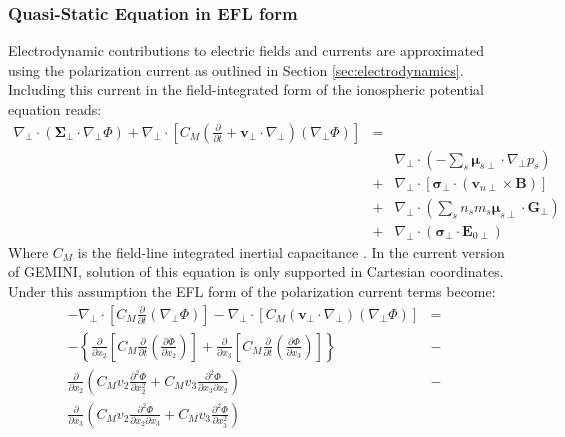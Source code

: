 \documentclass[11pt,letterpaper]{article}
\begin{document}
\subsubsection{Quasi-Static Equation in EFL form}

Electrodynamic contributions to electric fields and currents are approximated using the polarization current as outlined in Section \ref{sec:electrodynamics}.  Including this current in the field-integrated form of the ionospheric potential equation reads:    
\begin{eqnarray}
  \nabla_\perp \cdot \left( \boldsymbol{\Sigma}_\perp \cdot \nabla_\perp \Phi \right) + \nabla_\perp \cdot \left[ C_M \left( \frac{\partial}{\partial t}  + \mathbf{v}_\perp \cdot \nabla_\perp \right) \left( \nabla_\perp \Phi \right) \right]  &=& \nonumber \\ 
& & \nabla_\perp \cdot \left(  - \sum_s \boldsymbol{\mu}_{s\perp} \cdot \nabla_\perp p_s \right) \nonumber \\
&+&\nabla_\perp \cdot \left[ \boldsymbol{\sigma}_\perp \cdot \left( \mathbf{v}_{n\perp} \times \mathbf{B} \right) \right] \nonumber \\
&+& \nabla_\perp \cdot \left(  \sum_s n_s m_s  \boldsymbol{\mu}_{s\perp} \cdot \mathbf{G}_\perp \right)  \nonumber \\
&+& \nabla_\perp \cdot \left( \boldsymbol{\sigma}_\perp \cdot \mathbf{E}_{0\perp} \right) \label{eqn:curvpot} \label{eqn:electro}
\end{eqnarray}
Where $C_M$ is the field-line integrated inertial capacitance \citep{Mitchell:1985}.  In the current version of GEMINI, solution of this equation is only supported in Cartesian coordinates.  %
Under this assumption the EFL form of the polarization current terms become:
\begin{eqnarray}
- \nabla_\perp \cdot \left[ C_M \frac{\partial}{\partial t} \left( \nabla_\perp \Phi \right) \right]  - \nabla_\perp \cdot \left[ C_M \left( \mathbf{v}_\perp \cdot \nabla_\perp  \right) \left( \nabla_\perp \Phi \right) \right] &=& \nonumber \\
- \left\{ \frac{\partial}{\partial x_2} \left[ C_M \frac{\partial}{\partial t} \left( \frac{\partial \Phi}{\partial x_2} \right) \right] + \frac{\partial}{\partial x_3} \left[ C_M \frac{\partial}{\partial t} \left( \frac{\partial \Phi}{\partial x_3} \right) \right] \right\} &-& \nonumber \\
\frac{\partial}{\partial x_2} \left( C_M v_2 \frac{\partial^2 \Phi}{\partial x_2^2} + C_M v_3 \frac{\partial^2 \Phi}{\partial x_3 \partial x_2} \right) &-& \nonumber \\
\frac{\partial}{\partial x_3} \left( C_M v_2 \frac{\partial^2 \Phi}{\partial x_2 \partial x_3} + C_M v_3 \frac{\partial^2 \Phi}{\partial x_3^2} \right)
\end{eqnarray}
\end{document}

